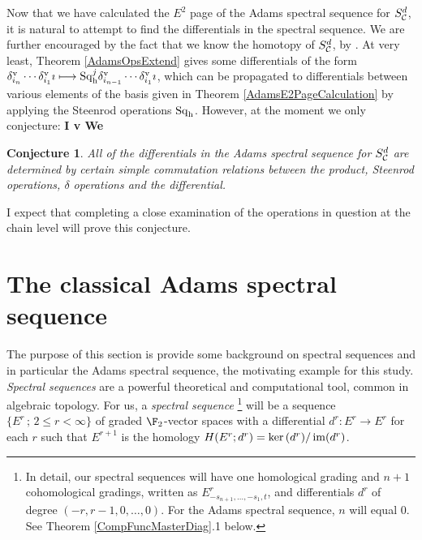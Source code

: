 \documentclass[11pt]{article}
\theoremstyle{plain}
\newtheorem{conjectureAlpha}{Conjecture}
\newcommand{\Sq}{\mathrm{Sq}}
\begin{document}
%











Now that we have calculated the $E^2$ page of the Adams spectral sequence for $S^d_{\mathcal{C}}$, it is natural to attempt to find the differentials in the spectral sequence. We are further encouraged by the fact that we know the homotopy of $S^d_{\mathcal{C}}$, by \cite{DwyerHtpyOpsSimpComAlg.pdf}. At very least, Theorem \ref{AdamsOpsExtend} gives some differentials of the form $\delta_{i_n}^\textup{v}\cdots \delta_{i_1}^\textup{v}\imath\mapsto \Sq_\textup{h}^{j}\delta_{i_{n-1}}^\textup{v}\cdots \delta_{i_1}^\textup{v}\imath$, which can be propagated to differentials between various elements of the basis given in Theorem \ref{AdamsE2PageCalculation} by applying the Steenrod operations $\Sq_\textup{h}$. However, at the moment we only conjecture: \textbf{I v We}
\begin{conjectureAlpha}
All of the differentials in the Adams spectral sequence for $S^d_{\mathcal{C}}$ are determined by certain simple commutation relations between the product, Steenrod operations, $\delta$ operations and the differential.
\end{conjectureAlpha}
\noindent I expect that completing a close examination of the operations in question at the chain level will prove this conjecture.
\section{The classical Adams spectral sequence}\label{backgroundSection}
The purpose of this section is provide some background on spectral sequences and in particular the Adams spectral sequence, the motivating example for this study.
\emph{Spectral sequences} are a powerful theoretical and computational tool, common in algebraic topology. %
For us, a \emph{spectral sequence}%
\footnote{In detail, our spectral sequences will have one homological grading and $n+1$ cohomological gradings, written as $E^r_{-s_{n+1},\ldots,-s_1,t}$, and differentials $d^r$ of degree $(-r,r-1,0,\ldots,0)$. For the Adams spectral sequence, $n$ will equal $0$. See Theorem \ref{CompFuncMasterDiag}.1 below.} will be a sequence $\{E^r\,;\,2\leq r<\infty\}$ of graded $\F_2$-vector spaces with a differential $d^r:E^r\to E^r$ for each $r$ such that $E^{r+1}$ is the homology $H(E^r;d^r)=\textup{ker}\,(d^r)/\operatorname{im}(d^r)$.
\end{document}
